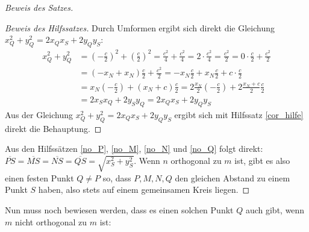 \begin{proof}[Beweis des Satzes]
\begin{proof}[Beweis des Hilfssatzes]
        Durch Umformen ergibt sich direkt die Gleichung $x_Q^2+y_Q^2=2x_Qx_S+2y_Qy_S$:
        \begin{align*}
            x_Q^2+y_Q^2&=\left(-\frac{c}{2}\right)^2+\left(\frac{c}{2}\right)^2=\frac{c^2}{4}+\frac{c^2}{4}
            =2\cdot \frac{c^2}{4}=\frac{c^2}{2}=0\cdot \frac{c}{2}+\frac{c^2}{2}\\
            &=(-x_N+x_N)\frac{c}{2}+\frac{c^2}{2}=-x_N\frac{c}{2}+x_N\frac{c}{2}+c\cdot\frac{c}{2}\\
            &=x_N\left(-\frac{c}{2}\right)+(x_N+c)\frac{c}{2}=2\frac{x_N}{2}
            \left(-\frac{c}{2}\right)+2\frac{x_N+c}{2}\frac{c}{2}\\
            &=2x_Sx_Q+2y_Sy_Q=2x_Qx_S+2y_Qy_S
        \end{align*}
        Aus der Gleichung $x_Q^2+y_Q^2=2x_Qx_S+2y_Qy_S$ ergibt sich mit Hilfssatz \ref{cor_hilfe} direkt die Behauptung.
    \end{proof}
    Aus den Hilfssätzen \ref{no_P}, \ref{no_M}, \ref{no_N} und \ref{no_Q} folgt direkt: 
    $\overline{PS}=\overline{MS}=\overline{NS}=\overline{QS}=\sqrt{x_S^2+y_S^2}$. Wenn $n$ orthogonal zu $m$ ist, 
    gibt es also einen festen Punkt $Q\neq P$ so, dass $P, M, N, Q$ den gleichen Abstand zu einem Punkt $S$ haben, 
    also stets auf einem gemeinsamen Kreis liegen.
    \renewcommand{\qedsymbol}{$\blacksquare$}
\end{proof}

Nun muss noch bewiesen werden, dass es einen solchen Punkt $Q$ auch gibt, wenn $m$ nicht orthogonal zu $m$ ist:

